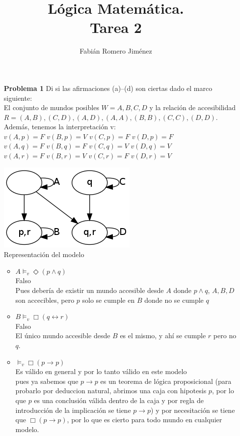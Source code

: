 \documentclass{article}
\title{Lógica Matemática. \\Tarea 2}
\author{Fabián Romero Jiménez}
\date{}
\begin{document}
\maketitle
\begin{enumerate}

\item[\bf{Problema 1}] Di si las afirmaciones (a)–(d) son ciertas dado el marco siguiente:\\
El conjunto de mundos posibles $W = {A,B,C,D}$ y la relación de accesibilidad
$R = {(A,B), (C,D), (A,D), (A,A), (B,B), (C,C), (D,D)}.$\\
Además, tenemos la interpretación v:\\
$v(A, p) = F$ $v(B, p) = V$ $v(C, p) = F$ $v(D, p) = F$\\
$v(A, q) = F$ $v(B, q) = F$ $v(C, q) = V$ $v(D, q) = V$\\
$v(A, r) = F$ $v(B, r) = V$ $v(C, r) = F$ $v(D, r) = V$\\

\begin{center}
  \includegraphics[scale=0.5]{graph1.png}\\
  Representación del modelo
\end{center}


\begin{itemize}
\item $A \models_v \Diamond (p \wedge q)$\\
Falso\\
Pues debería de existir un mundo accesible desde $A$ donde $p \wedge q$, ${A,B,D}$ son accecibles, pero $p$ solo se cumple en $B$ donde no se cumple $q$
\item $B \models_v \Box (q \leftrightarrow r)$\\
Falso\\
El único mundo accesible desde $B$ es el mismo, y ahí se cumple $r$ pero no $q$.
\item $\models_v \Box (p \rightarrow p)$\\
Es válido en general y por lo tanto válido en este modelo\\
pues ya sabemos que $p \rightarrow p$ es un teorema de lógica proposicional (para probarlo por deduccion natural, abrimos una caja con hipotesis $p$, por lo que $p$ es una conclusión válida dentro de la caja y por regla de introducción de la implicación se tiene $p \rightarrow p$) y por necesitación se tiene que $\Box (p \rightarrow p)$, por lo que es cierto para todo mundo en cualquier modelo.


\end{itemize}
\end{enumerate}
\end{document}

